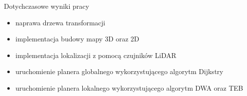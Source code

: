 \begin{frame}
{Dotychczasowe wyniki pracy}
	\begin{itemize}
		\item naprawa drzewa transformacji
		\item implementacja budowy mapy 3D oraz 2D
		\item implementacja lokalizacji z pomocą czujników LiDAR
		\item uruchomienie planera globalnego wykorzystującego algorytm Dijkstry
		\item uruchomienie planera lokalnego wykorzystującego algorytm DWA oraz TEB
	\end{itemize}
\end{frame}